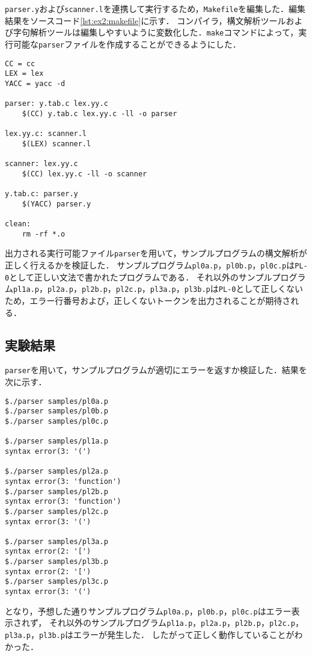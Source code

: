 \documentclass[uplatex]{jsarticle}
\begin{document}
\verb#parser.y#および\verb#scanner.l#を連携して実行するため，\verb#Makefile#を編集した．編集結果をソースコード\ref{lst:ex2:makefile}に示す．
コンパイラ，構文解析ツールおよび字句解析ツールは編集しやすいように変数化した．\verb#make#コマンドによって，実行可能な\verb#parser#ファイルを作成することができるようにした．
\begin{lstlisting}[caption=Makefileの修正,label=lst:ex2:makefile]
CC = cc
LEX = lex
YACC = yacc -d

parser: y.tab.c lex.yy.c
	$(CC) y.tab.c lex.yy.c -ll -o parser

lex.yy.c: scanner.l
	$(LEX) scanner.l

scanner: lex.yy.c
	$(CC) lex.yy.c -ll -o scanner

y.tab.c: parser.y
	$(YACC) parser.y

clean:
	rm -rf *.o

\end{lstlisting}
出力される実行可能ファイル\verb#parser#を用いて，サンプルプログラムの構文解析が正しく行えるかを検証した．
サンプルプログラム\verb#pl0a.p#，\verb#pl0b.p#，\verb#pl0c.p#は\verb#PL-0#として正しい文法で書かれたプログラムである．
それ以外のサンプルプログラム\verb#pl1a.p#，\verb#pl2a.p#，\verb#pl2b.p#，\verb#pl2c.p#，\verb#pl3a.p#，\verb#pl3b.p#は\verb#PL-0#として正しくないため，エラー行番号および，正しくないトークンを出力されることが期待される．

\subsection{実験結果}
\verb#parser#を用いて，サンプルプログラムが適切にエラーを返すか検証した．結果を次に示す．

\begin{lstlisting}[caption=parserの実行結果,label=lst:ex2:result-pl0a.p]
$./parser samples/pl0a.p
$./parser samples/pl0b.p
$./parser samples/pl0c.p

$./parser samples/pl1a.p
syntax error(3: '(')

$./parser samples/pl2a.p
syntax error(3: 'function')
$./parser samples/pl2b.p
syntax error(3: 'function')
$./parser samples/pl2c.p
syntax error(3: '(')

$./parser samples/pl3a.p
syntax error(2: '[')
$./parser samples/pl3b.p
syntax error(2: '[')
$./parser samples/pl3c.p
syntax error(3: '(')
\end{lstlisting}
となり，予想した通りサンプルプログラム\verb#pl0a.p#，\verb#pl0b.p#，\verb#pl0c.p#はエラー表示されず，
それ以外のサンプルプログラム\verb#pl1a.p#，\verb#pl2a.p#，\verb#pl2b.p#，\verb#pl2c.p#，\verb#pl3a.p#，\verb#pl3b.p#はエラーが発生した．
したがって正しく動作していることがわかった．
\end{document}

